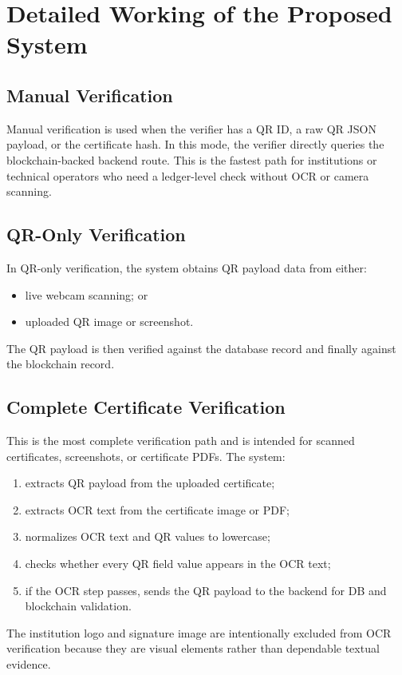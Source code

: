 \documentclass[12pt,a4paper]{article}
\begin{document}
\section{Detailed Working of the Proposed System}
\subsection{Manual Verification}
Manual verification is used when the verifier has a QR ID, a raw QR JSON payload, or the certificate hash. In this mode, the verifier directly queries the blockchain-backed backend route. This is the fastest path for institutions or technical operators who need a ledger-level check without OCR or camera scanning.

\subsection{QR-Only Verification}
In QR-only verification, the system obtains QR payload data from either:
\begin{itemize}[leftmargin=1.5em]
\item live webcam scanning; or
\item uploaded QR image or screenshot.
\end{itemize}
The QR payload is then verified against the database record and finally against the blockchain record.

\subsection{Complete Certificate Verification}
This is the most complete verification path and is intended for scanned certificates, screenshots, or certificate PDFs. The system:
\begin{enumerate}[leftmargin=1.5em]
\item extracts QR payload from the uploaded certificate;
\item extracts OCR text from the certificate image or PDF;
\item normalizes OCR text and QR values to lowercase;
\item checks whether every QR field value appears in the OCR text;
\item if the OCR step passes, sends the QR payload to the backend for DB and blockchain validation.
\end{enumerate}

The institution logo and signature image are intentionally excluded from OCR verification because they are visual elements rather than dependable textual evidence.
\end{document}
